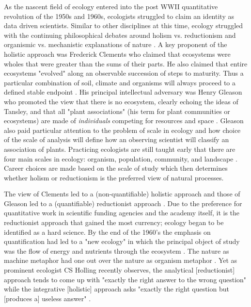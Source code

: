 As the nascent field of ecology entered into the post WWII quantitative revolution of the 1950s and 1960s, ecologists struggled to claim an identity as data driven scientists. Similar to other disciplines at this time, ecology struggled with the continuing philosophical debates around holism vs. reductionism and organismic vs. mechanistic explanations of nature \citep{barbour_1996}. A key proponent of the holistic approach was Frederick Clements who claimed that ecosystems were wholes that were greater than the sums of their parts. He also claimed that entire ecosystems "evolved" along an observable succession of steps to maturity. Thus a particular combination of soil, climate and organisms will always proceed to a defined stable endpoint \citep{clements_1936}. His principal intellectual adversary was Henry Gleason who promoted the view that there is no ecosystem, clearly echoing the ideas of Tansley, and that all "plant associations" (his term for plant communities or ecosystems) are made of \textit{individuals} competing for resources and space \citep{gleason_1939}.  Gleason also paid particular attention to the problem of scale in ecology and how choice of the scale of analysis will define how an observing scientist will classify an association of plants. Practicing ecologists are still taught early that there are four main scales in ecology: organism, population, community, and landscape \citep{odum_1953}. Career choices are made based on the scale of study which then determines whether holism or reductionism is the preferred view of natural processes.

The view of Clements led to a (non-quantifiable) holistic approach and those of Gleason led to a (quantifiable) reductionist approach \citep{barbour_1996,worster_1977}. Due to the preference for quantitative work in scientific funding agencies and the academy itself, it is the reductionist approach that gained the most currency; ecology began to be identified as a hard science. By the end of the 1960's the emphasis on quantification had led to a "new ecology" in which the principal object of study was the flow of energy and nutrients through the ecosystem \citep{worster_1977, barbour_1996}. The nature as machine metaphor had one out over the nature as organism metaphor \citep{hagen_1992}. Yet as prominent ecologist CS Holling recently observes, the analytical [reductionist] approach tends to come up with "exactly the right answer to the wrong question" while the integrative [holistic] approach asks "exactly the right question but [produces a] useless answer" \citep[][p. 3]{holling_1998}.


